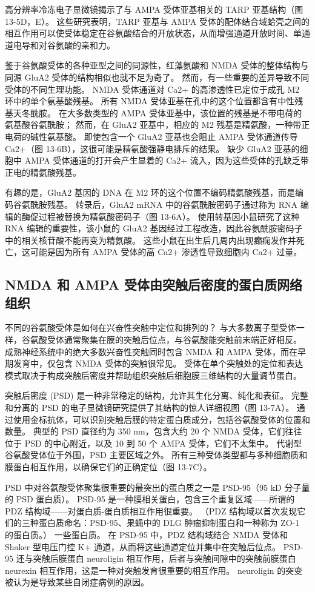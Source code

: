 高分辨率冷冻电子显微镜揭示了与 AMPA 受体亚基相关的 TARP 亚基结构（图 13-5D，E）。 这些研究表明，TARP 亚基与 AMPA 受体的配体结合域蛤壳之间的相互作用可以使受体稳定在谷氨酸结合的开放状态，从而增强通道开放时间、单通道电导和对谷氨酸的亲和力。

鉴于谷氨酸受体的各种亚型之间的同源性，红藻氨酸和 NMDA 受体的整体结构与同源 GluA2 受体的结构相似也就不足为奇了。 然而，有一些重要的差异导致不同受体的不同生理功能。 NMDA 受体通道对 Ca2+ 的高渗透性已定位于成孔 M2 环中的单个氨基酸残基。 所有 NMDA 受体亚基在孔中的这个位置都含有中性残基天冬酰胺。 在大多数类型的 AMPA 受体亚基中，该位置的残基是不带电荷的氨基酸谷氨酰胺； 然而，在 GluA2 亚基中，相应的 M2 残基是精氨酸，一种带正电荷的碱性氨基酸。 即使包含一个 GluA2 亚基也会阻止 AMPA 受体通道传导 Ca2+（图 13-6B），这很可能是精氨酸强静电排斥的结果。 缺少 GluA2 亚基的细胞中 AMPA 受体通道的打开会产生显着的 Ca2+ 流入，因为这些受体的孔缺乏带正电的精氨酸残基。

有趣的是，GluA2 基因的 DNA 在 M2 环的这个位置不编码精氨酸残基，而是编码谷氨酰胺残基。 转录后，GluA2 mRNA 中的谷氨酰胺密码子通过称为 RNA 编辑的酶促过程被替换为精氨酸密码子（图 13-6A）。 使用转基因小鼠研究了这种 RNA 编辑的重要性，该小鼠的 GluA2 基因经过工程改造，因此谷氨酰胺密码子中的相关核苷酸不能再变为精氨酸。 这些小鼠在出生后几周内出现癫痫发作并死亡，这可能是因为所有 AMPA 受体的高 Ca2+ 渗透性导致细胞内 Ca2+ 过量。

\subsection{NMDA 和 AMPA 受体由突触后密度的蛋白质网络组织}
不同的谷氨酸受体是如何在兴奋性突触中定位和排列的？ 与大多数离子型受体一样，谷氨酸受体通常聚集在膜的突触后位点，与谷氨酸能突触前末端正好相反。 成熟神经系统中的绝大多数兴奋性突触同时包含 NMDA 和 AMPA 受体，而在早期发育中，仅包含 NMDA 受体的突触很常见。 受体在单个突触处的定位和表达模式取决于构成突触后密度并帮助组织突触后细胞膜三维结构的大量调节蛋白。

突触后密度 (PSD) 是一种非常稳定的结构，允许其生化分离、纯化和表征。 完整和分离的 PSD 的电子显微镜研究提供了其结构的惊人详细视图（图 13-7A）。 通过使用金标抗体，可以识别突触后膜的特定蛋白质成分，包括谷氨酸受体的位置和数量。 典型的 PSD 直径约为 350 nm，包含大约 20 个 NMDA 受体，它们往往位于 PSD 的中心附近，以及 10 到 50 个 AMPA 受体，它们不太集中。 代谢型谷氨酸受体位于外围，PSD 主要区域之外。 所有三种受体类型都与多种细胞质和膜蛋白相互作用，以确保它们的正确定位（图 13-7C）。

PSD 中对谷氨酸受体聚集很重要的最突出的蛋白质之一是 PSD-95（95 kD 分子量的 PSD 蛋白质）。 PSD-95 是一种膜相关蛋白，包含三个重复区域——所谓的 PDZ 结构域——对蛋白质-蛋白质相互作用很重要。 （PDZ 结构域以首次发现它们的三种蛋白质命名：PSD-95、果蝇中的 DLG 肿瘤抑制蛋白和一种称为 ZO-1 的蛋白质。） 一些蛋白质。 在 PSD-95 中，PDZ 结构域结合 NMDA 受体和 Shaker 型电压门控 K+ 通道，从而将这些通道定位并集中在突触后位点。 PSD-95 还与突触后膜蛋白 neuroligin 相互作用，后者与突触间隙中的突触前膜蛋白 neurexin 相互作用，这是一种对突触发育很重要的相互作用。 neuroligin 的突变被认为是导致某些自闭症病例的原因。

